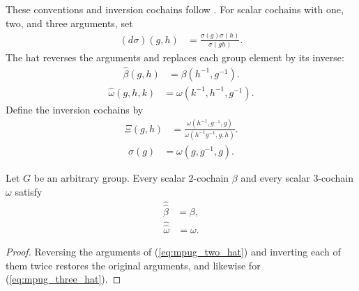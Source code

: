 \begin{definition}
    \label{def:mpug_inversion_cochains}
    \leanok
    These conventions and inversion cochains follow
    \cite[lines~5910--5916 and 5967--5973]{FrancoRubio2025MPUGauging}.
    For scalar cochains with one, two, and three arguments, set
    \begin{align}
        (d\sigma)(g,h) & =\frac{\sigma(g)\sigma(h)}{\sigma(gh)}.
        \label{eq:mpug_one_coboundary}
    \end{align}
    The hat reverses the arguments and replaces each group element by its
    inverse:
    \begin{align}
        \widehat\beta(g,h) & =\beta(h^{-1},g^{-1}).
        \label{eq:mpug_two_hat}
    \end{align}
    \begin{align}
        \widehat\omega(g,h,k) & =\omega(k^{-1},h^{-1},g^{-1}).
        \label{eq:mpug_three_hat}
    \end{align}
    Define the inversion cochains by
    \begin{align}
        \Xi(g,h) & =
        \frac{\omega(h^{-1},g^{-1},g)}
        {\omega(h^{-1}g^{-1},g,h)}.
        \label{eq:mpug_intro_Xi}
    \end{align}
    \begin{align}
        \sigma(g) & =\omega(g,g^{-1},g).
        \label{eq:mpug_intro_sigma}
    \end{align}
\end{definition}

\begin{lemma}
    \label{thm:mpug_scalar_hat_involution}
    \leanok
    Let $G$ be an arbitrary group. Every scalar $2$-cochain $\beta$ and every
    scalar $3$-cochain $\omega$ satisfy
    \begin{align}
        \widehat{\widehat\beta} & =\beta,
        \label{eq:mpug_two_hat_hat}
    \end{align}
    \begin{align}
        \widehat{\widehat\omega} & =\omega.
        \label{eq:mpug_three_hat_hat}
    \end{align}
\end{lemma}
\begin{proof}\leanok
    Reversing the arguments of (\ref{eq:mpug_two_hat}) and inverting each of
    them twice restores the original arguments, and likewise for
    (\ref{eq:mpug_three_hat}).
\end{proof}

